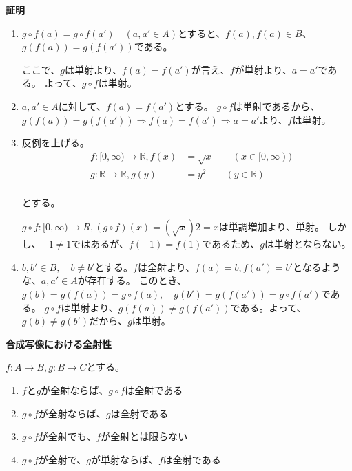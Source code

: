 \documentclass[dvipdfmx,autodetect-engine]{jsarticle}
\begin{document}
{\bf 証明}

\begin{enumerate}
\renewcommand{\labelenumi}{(\arabic{enumi})}
	\item $g \circ f(a) = g \circ f(a') \quad (a, a' \in A)$とすると、$f(a), f(a) \in B$、$g(f(a)) = g(f(a'))$である。
	
	ここで、$g$は単射より、$f(a) = f(a')$が言え、$f$が単射より、$a = a'$である。
	よって、$g \circ f$は単射。
	
	\item $a,a' \in A$に対して、$f(a) = f(a')$とする。
	$g \circ f$は単射であるから、$g(f(a)) = g(f(a')) \Rightarrow f(a) = f(a') \Rightarrow a = a'$より、$f$は単射。

    \item 反例を上げる。
    \begin{eqnarray*}
    &f:[0,∞) \to \mathbb{R}, f(x) &= \sqrt{x} \quad \quad (x \in [0,∞)) \\
    &g:\mathbb{R} \to \mathbb{R}, g(y) &= y^2  \quad \quad (y \in \mathbb{R}) \\
    \end{eqnarray*}
    
    とする。
    
    $g \circ f : [0,∞) \to R, (g \circ f)(x) = (\sqrt{x})2= x$は単調増加より、単射。
    しかし、$-1 \neq 1$ではあるが、$f(-1) = f(1)$であるため、$g$は単射とならない。
    
    
    \item $b, b' \in B, \quad b \neq b'$とする。$f$は全射より、$f(a) = b, f(a') = b'$となるような、$a, a' \in A$が存在する。
    このとき、$g(b) = g(f(a)) = g \circ f(a), \quad g(b') = g(f(a')) = g \circ f(a')$である。
    $g \circ f$は単射より、$g(f(a)) \neq g(f(a'))$である。よって、$g(b) \neq g(b')$だから、$g$は単射。
	
\end{enumerate}

\prop

 {\bf 合成写像における全射性 }
 
 $f:A \to B, g: B \to C$とする。

\begin{enumerate}
\renewcommand{\labelenumi}{(\arabic{enumi})}
	\item $f$と$g$が全射ならば、$g \circ f$は全射である
	\item $g \circ f$が全射ならば、$g$は全射である
	\item $g \circ f$が全射でも、$f$が全射とは限らない
	\item $g \circ f$が全射で、$g$が単射ならば、$f$は全射である
\end{enumerate}
\end{document}
